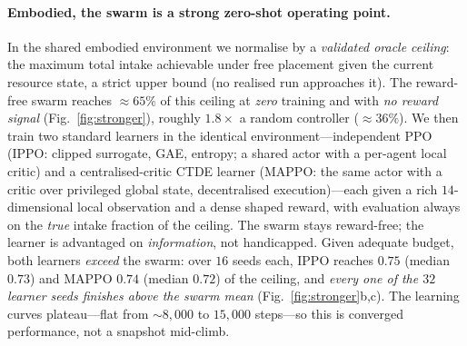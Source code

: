 \documentclass{article}
\begin{document}
\paragraph{Embodied, the swarm is a strong zero-shot operating point.} In the shared embodied environment we
normalise by a \emph{validated oracle ceiling}: the maximum total intake achievable under free placement given
the current resource state, a strict upper bound (no realised run approaches it). The reward-free swarm
reaches ${\approx}65\%$ of this ceiling at \emph{zero} training and with \emph{no reward signal}
(Fig.~\ref{fig:stronger}), roughly $1.8\times$ a random controller (${\approx}36\%$). We then train two
standard learners in the identical environment---independent PPO (IPPO: clipped surrogate, GAE, entropy; a
shared actor with a per-agent local critic) and a centralised-critic CTDE learner (MAPPO: the same actor with
a critic over privileged global state, decentralised execution)---each given a rich $14$-dimensional local
observation and a dense shaped reward, with evaluation always on the \emph{true} intake fraction of the
ceiling. The swarm stays reward-free; the learner is advantaged on \emph{information}, not handicapped. Given
adequate budget, both learners \emph{exceed} the swarm: over $16$ seeds each, IPPO reaches $0.75$ (median
$0.73$) and MAPPO $0.74$ (median $0.72$) of the ceiling, and \emph{every one of the $32$ learner seeds finishes
above the swarm mean} (Fig.~\ref{fig:stronger}b,c). The learning curves plateau---flat from ${\sim}8{,}000$ to
$15{,}000$ steps---so this is converged performance, not a snapshot mid-climb.
\end{document}
